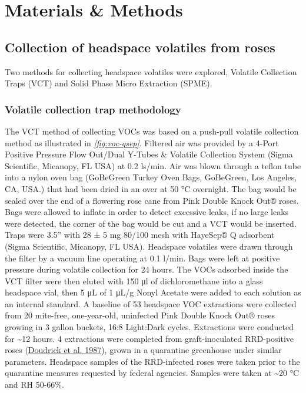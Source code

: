 \documentclass{ufdissertation}[overrideChapters] %
\begin{document}
{\hypertarget{materials-methods-1}{%
\section{Materials \& Methods}\label{materials-methods-1}}

\hypertarget{collection-of-headspace-volatiles-from-roses}{%
\subsection{Collection of headspace volatiles from roses}\label{collection-of-headspace-volatiles-from-roses}}

Two methods for collecting headspace volatiles were explored, Volatile Collection Traps (VCT) and Solid Phase Micro Extraction (SPME).

\hypertarget{volatile-collection-trap-methodology}{%
\subsubsection{Volatile collection trap methodology}\label{volatile-collection-trap-methodology}}

The VCT method of collecting VOCs was based on a push-pull volatile collection method as illustrated in \emph{\ref{fig:voc-qsep}}. Filtered air was provided by a 4-Port Positive Pressure Flow Out/Dual Y-Tubes \& Volatile Collection System (Sigma Scientific, Micanopy, FL USA) at 0.2 \si{\litre}s/min. Air was blown through a teflon tube into a nylon oven bag (GoBeGreen Turkey Oven Bags, GoBeGreen, Los Angeles, CA, USA.) that had been dried in an over at 50 °C overnight. The bag would be sealed over the end of a flowering rose cane from Pink Double Knock Out® roses. Bags were allowed to inflate in order to detect excessive leaks, if no large leaks were detected, the corner of the bag would be cut and a VCT would be inserted. Traps were 3.5'' with 28 ± 5 \si{\milli\gram} 80/100 mesh with HayeSep® Q adsorbent (Sigma Scientific, Micanopy, FL USA). Headspace volatiles were drawn through the filter by a vacuum line operating at 0.1 \si{\litre}/min. Bags were left at positive pressure during volatile collection for 24 hours. The VOCs adsorbed inside the VCT filter were then eluted with 150 \si{\micro\litre} of dichloromethane into a glass headspace vial, then 5 \si{\micro\liter} of 1 \si{\micro\liter}/\si{\gram} Nonyl Acetate were added to each solution as an internal standard. A baseline of 53 headspace VOC extractions were collected from 20 mite-free, one-year-old, uninfected Pink Double Knock Out® roses growing in 3 gallon buckets, 16:8 Light:Dark cycles. Extractions were conducted for \textasciitilde12 hours. 4 extractions were completed from graft-inoculated RRD-positive roses (\protect\hyperlink{ref-Doudrick1987}{Doudrick et al. 1987}), grown in a quarantine greenhouse under similar parameters. Headspace samples of the RRD-infected roses were taken prior to the quarantine measures requested by federal agencies. Samples were taken at \textasciitilde20 °C and RH 50-66\%.

}
\end{document}
